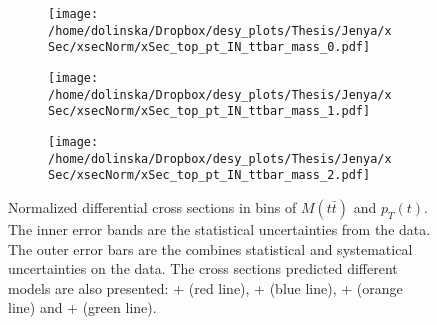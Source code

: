 \begin{figure}[p]
\centering
\begin{subfigure}
  \centering
  \texttt{[image: /home/dolinska/Dropbox/desy\_plots/Thesis/Jenya/xSec/xsecNorm/xSec\_top\_pt\_IN\_ttbar\_mass\_0.pdf]}
\end{subfigure}
\begin{subfigure}
  \centering
  \texttt{[image: /home/dolinska/Dropbox/desy\_plots/Thesis/Jenya/xSec/xsecNorm/xSec\_top\_pt\_IN\_ttbar\_mass\_1.pdf]}
\end{subfigure}
\begin{subfigure}
  \centering
  \texttt{[image: /home/dolinska/Dropbox/desy\_plots/Thesis/Jenya/xSec/xsecNorm/xSec\_top\_pt\_IN\_ttbar\_mass\_2.pdf]}
\end{subfigure}
\caption{Normalized differential cross sections in bins of $M(t\bar{t})$ and $p_{T}(t)$. The inner error bands are the statistical uncertainties from the data.
         The outer error bars are the combines statistical and systematical uncertainties on the data. The cross sections predicted different models are also presented:
         \MG + \PYTHIA (red line), \Powheg + \PYTHIA (blue line), \Powheg + \HERWIG (orange line) and \MCNLO + \HERWIG (green line).}
\label{fig:XS_2D_Mtt_pt}
\end{figure}
